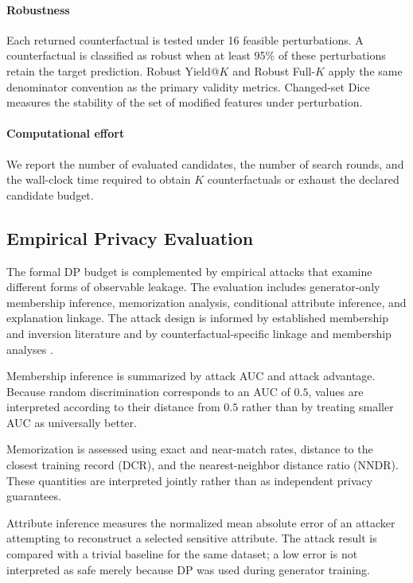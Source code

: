 \documentclass[preprint,12pt]{elsarticle}
\begin{document}
\paragraph{Robustness}
Each returned counterfactual is tested under 16 feasible perturbations. A
counterfactual is classified as robust when at least 95\% of these perturbations
retain the target prediction. Robust Yield@$K$ and Robust Full-$K$ apply the
same denominator convention as the primary validity metrics. Changed-set Dice
measures the stability of the set of modified features under perturbation.

\paragraph{Computational effort}
We report the number of evaluated candidates, the number of search rounds, and the wall-clock time required to obtain $K$ counterfactuals or exhaust the
declared candidate budget.

\subsection{Empirical Privacy Evaluation}
\label{subsec:privacy_attacks}

The formal DP budget is complemented by empirical attacks that examine
different forms of observable leakage. The evaluation includes generator-only
membership inference, memorization analysis, conditional attribute inference,
and explanation linkage. The attack design is informed by established
membership and inversion literature
\cite{shokri2017membership,yeom2018privacy,fredrikson2015inversion} and by
counterfactual-specific linkage and membership analyses
\cite{goethals2023privacy,babaei2026privacycf}.

Membership inference is summarized by attack AUC and attack advantage. Because
random discrimination corresponds to an AUC of $0.5$, values are interpreted
according to their distance from $0.5$ rather than by treating smaller AUC as
universally better.

Memorization is assessed using exact and near-match rates, distance to the
closest training record (DCR), and the nearest-neighbor distance ratio (NNDR).
These quantities are interpreted jointly rather than as independent privacy
guarantees.

Attribute inference measures the normalized mean absolute error of an attacker
attempting to reconstruct a selected sensitive attribute. The attack result is
compared with a trivial baseline for the same dataset; a low error is not
interpreted as safe merely because DP was used during generator training.
\end{document}
